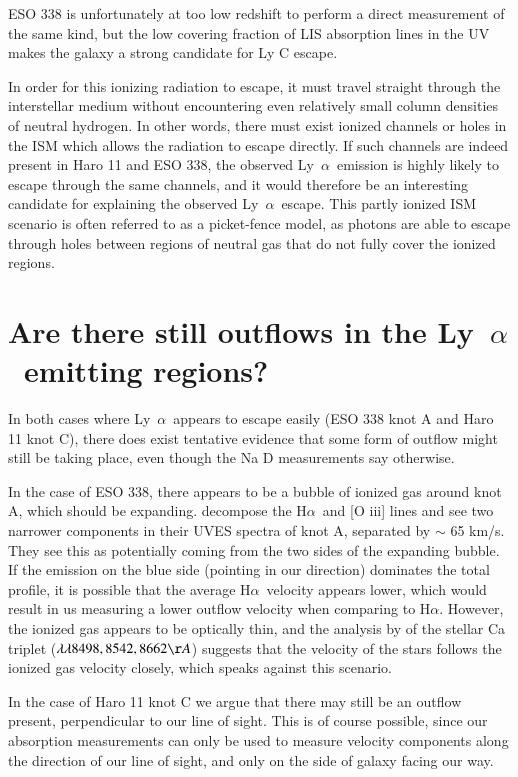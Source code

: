 \documentclass[a4wide,12pt]{book}
\newcommand{\ha}{H${\alpha}$}
\newcommand{\lya}{Ly~${\alpha}$}
\begin{document}
{ESO 338 is unfortunately at too low redshift to perform a direct measurement of the same kind, but the low covering fraction of LIS absorption lines in the UV makes the galaxy a strong candidate for Ly C escape. 

In order for this ionizing radiation to escape, it must travel straight through the interstellar medium without encountering even relatively small column densities of neutral hydrogen. In other words, there must exist ionized channels or holes in the ISM which allows the radiation to escape directly. If such channels are indeed present in Haro 11 and ESO 338, the observed \lya\ emission is highly likely to escape through the same channels, and it would therefore be an interesting candidate for explaining the observed \lya\ escape. This partly ionized ISM scenario is often referred to as a picket-fence model, as photons are able to escape through holes between regions of neutral gas that do not fully cover the ionized regions. 

\section{Are there still outflows in the \lya\ emitting regions?}

In both cases where \lya\ appears to escape easily (ESO 338 knot A and Haro 11 knot C), there does exist tentative evidence that some form of outflow might still be taking place, even though the Na D measurements say otherwise.  

In the case of ESO 338, there appears to be a bubble of ionized gas around knot A, which should be expanding. \citet{ostlin-2007} decompose the \ha\ and [O {\sc iii}] lines and see two narrower components in their UVES spectra of knot A, separated by $\sim$ 65 km/s. They see this as potentially coming from the two sides of the expanding bubble. If the emission on the blue side (pointing in our direction) dominates the total profile, it is possible that the average \ha\ velocity appears lower, which would result in us measuring a lower outflow velocity when comparing to \ha . However, the ionized gas appears to be optically thin, and the analysis by \citet{cumming-2008} of the stellar Ca triplet ($\lambda \lambda 8498, 8542, 8662 \AA$) suggests that the velocity of the stars follows the ionized gas velocity closely, which speaks against this scenario. 

In the case of Haro 11 knot C we argue that there may still be an outflow present, perpendicular to our line of sight. This is of course possible, since our absorption measurements can only be used to measure velocity components along the direction of our line of sight, and only on the side of galaxy facing our way.

}
\end{document}
